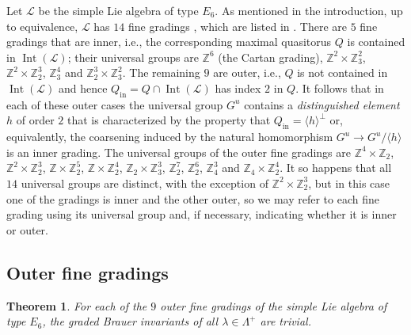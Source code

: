 \documentclass[a4paper,reqno]{amsart}
\newtheorem{theorem}{Theorem}
\theoremstyle{definition}
\numberwithin{theorem}{section}
\numberwithin{equation}{section}
\begin{document}
Let ${\mathcal{L}}$ be the simple Lie algebra of type $E_6$. As mentioned in the introduction, up to equivalence, ${\mathcal{L}}$ has $14$ fine gradings \cite{DV_E6}, which are listed in \cite[Fig. 6.2]{EK_mon}.  There are $5$ fine gradings that are inner, i.e., the corresponding maximal quasitorus $Q$ is contained in $\operatorname{\mathrm{Int}}({\mathcal{L}})$; their universal groups are ${\mathbb{Z}}^6$ (the Cartan grading), ${\mathbb{Z}}^2\times{\mathbb{Z}}_3^2$, ${\mathbb{Z}}^2\times{\mathbb{Z}}_2^3$, ${\mathbb{Z}}_3^4$ and ${\mathbb{Z}}_2^3\times{\mathbb{Z}}_3^2$. The remaining $9$ are  outer, i.e., $Q$ is not contained in $\operatorname{\mathrm{Int}}({\mathcal{L}})$ and hence $Q_\mathrm{in}=Q\cap\operatorname{\mathrm{Int}}({\mathcal{L}})$ has index $2$ in $Q$. It follows that in each of these outer cases the  universal group $G^u$ contains a {\em distinguished element} $h$ of order $2$ that is characterized by the property that $Q_\mathrm{in}=\langle h\rangle^\perp$ or, equivalently, the coarsening induced by the natural homomorphism $G^u\to G^u/\langle h\rangle$ is an inner grading. The universal groups of the outer fine gradings are ${\mathbb{Z}}^4\times{\mathbb{Z}}_2$, ${\mathbb{Z}}^2\times{\mathbb{Z}}_2^3$, ${\mathbb{Z}}\times{\mathbb{Z}}_2^5$, ${\mathbb{Z}}\times{\mathbb{Z}}_2^4$, ${\mathbb{Z}}_2\times{\mathbb{Z}}_3^3$, ${\mathbb{Z}}_2^7$, ${\mathbb{Z}}_2^6$, ${\mathbb{Z}}_4^3$ and ${\mathbb{Z}}_4\times{\mathbb{Z}}_2^4$. It so happens that all $14$ universal groups are distinct, with the exception of ${\mathbb{Z}}^2\times{\mathbb{Z}}_2^3$, but in this case one of the gradings is inner and the other outer, so we may refer to each fine grading using its universal group and, if necessary, indicating whether it is inner or outer.

\subsection{Outer fine gradings}

\begin{theorem}\label{th:E6_outer}
For each of the $9$ outer fine gradings of the simple Lie algebra of type $E_6$, the graded Brauer invariants of all $\lambda\in\Lambda^+$ are trivial.
\end{theorem}
\end{document}
